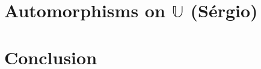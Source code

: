 \documentclass[12pt]{article}
\theoremstyle{plain}
\newtheorem{theorem}{Theorem}[section]
\theoremstyle{remark}
\theoremstyle{definition}
\theoremstyle{proposition}
\newtheorem{proposition}[theorem]{Proposition}
\newcommand{\II}{\mathbb{I} }
\newcommand{\UU}{\mathbb{U} }
\begin{document}







\section{Automorphisms on $\UU$ (Sérgio)}

\section{Conclusion}\label{sec-conc}
\end{document}
